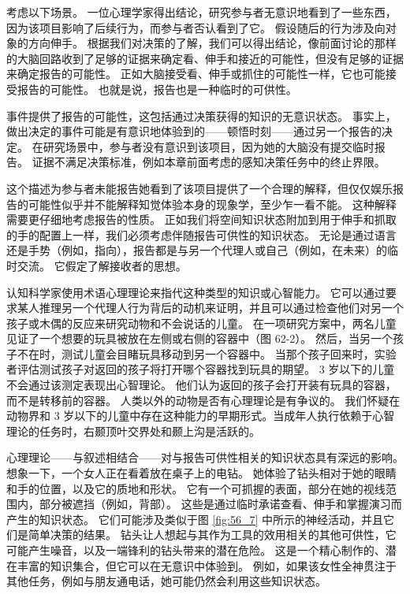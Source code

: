 考虑以下场景。 一位心理学家得出结论，研究参与者无意识地看到了一些东西，因为该项目影响了后续行为，而参与者否认看到了它。 假设随后的行为涉及向对象的方向伸手。 根据我们对决策的了解，我们可以得出结论，像前面讨论的那样的大脑回路收到了足够的证据来确定看、伸手和接近的可能性，但没有足够的证据来确定报告的可能性。 正如大脑接受看、伸手或抓住的可能性一样，它也可能接受报告的可能性。 也就是说，报告也是一种临时的可供性。

事件提供了报告的可能性，这包括通过决策获得的知识的无意识状态。 事实上，做出决定的事件可能是有意识地体验到的——顿悟时刻——通过另一个报告的决定。 在研究场景中，参与者没有意识到该项目，因为她的大脑没有提交临时报告。 证据不满足决策标准，例如本章前面考虑的感知决策任务中的终止界限。

这个描述为参与者未能报告她看到了该项目提供了一个合理的解释，但仅仅娱乐报告的可能性似乎并不能解释知觉体验本身的现象学，至少乍一看不能。 这种解释需要更仔细地考虑报告的性质。 正如我们将空间知识状态附加到用于伸手和抓取的手的配置上一样，我们必须考虑伴随报告可供性的知识状态。 无论是通过语言还是手势（例如，指向），报告都是与另一个代理人或自己（例如，在未来）的临时交流。 它假定了解接收者的思想。

认知科学家使用术语心理理论来指代这种类型的知识或心智能力。 它可以通过要求某人推理另一个代理人行为背后的动机来证明，并且可以通过检查他们对另一个孩子或木偶的反应来研究动物和不会说话的儿童。 在一项研究方案中，两名儿童见证了一个想要的玩具被放在左侧或右侧的容器中（图 62-2）。 然后，当另一个孩子不在时，测试儿童会目睹玩具移动到另一个容器中。 当那个孩子回来时，实验者评估测试孩子对返回的孩子将打开哪个容器找到玩具的期望。 3 岁以下的儿童不会通过该测定表现出心智理论。 他们认为返回的孩子会打开装有玩具的容器，而不是转移前的容器。 人类以外的动物是否有心理理论是有争议的。 我们怀疑在动物界和 3 岁以下的儿童中存在这种能力的早期形式。当成年人执行依赖于心智理论的任务时，右颞顶叶交界处和颞上沟是活跃的。

心理理论——与叙述相结合——对与报告可供性相关的知识状态具有深远的影响。 想象一下，一个女人正在看着放在桌子上的电钻。 她体验了钻头相对于她的眼睛和手的位置，以及它的质地和形状。 它有一个可抓握的表面，部分在她的视线范围内，部分被遮挡（例如，背部）。 这些是通过临时承诺查看、伸手和掌握演习而产生的知识状态。 它们可能涉及类似于图 \ref{fig:56_7} 中所示的神经活动，并且它们是简单决策的结果。 钻头让人想起与其作为工具的效用相关的其他可供性，它可能产生噪音，以及一端锋利的钻头带来的潜在危险。 这是一个精心制作的、潜在丰富的知识集合，但它可以在无意识中体验到。 例如，如果该女性全神贯注于其他任务，例如与朋友通电话，她可能仍然会利用这些知识状态。

